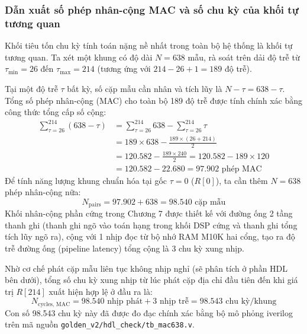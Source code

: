 \subsubsection*{Dẫn xuất số phép nhân-cộng MAC và số chu kỳ của khối tự tương quan}
Khối tiêu tốn chu kỳ tính toán nặng nề nhất trong toàn bộ hệ thống là khối tự tương quan. Ta xét một khung có độ dài $N = 638$ mẫu, rà soát trên dải độ trễ từ $\tau_{\min} = 26$ đến $\tau_{\max} = 214$ (tương ứng với $214 - 26 + 1 = 189$ độ trễ).

Tại một độ trễ $\tau$ bất kỳ, số cặp mẫu cần nhân và tích lũy là $N - \tau = 638 - \tau$. Tổng số phép nhân-cộng (MAC) cho toàn bộ 189 độ trễ được tính chính xác bằng công thức tổng cấp số cộng:
\begin{align}
\sum_{\tau=26}^{214} (638 - \tau) &= \sum_{\tau=26}^{214} 638 - \sum_{\tau=26}^{214} \tau \\
&= 189 \times 638 - \frac{189 \times (26 + 214)}{2} \\
&= 120.582 - \frac{189 \times 240}{2} = 120.582 - 189 \times 120 \\
&= 120.582 - 22.680 = 97.902\text{ phép MAC}
\end{align}
Để tính năng lượng khung chuẩn hóa tại gốc $\tau = 0$ ($R[0]$), ta cần thêm $N = 638$ phép nhân-cộng nữa:
\begin{equation}
N_{\text{pairs}} = 97.902 + 638 = 98.540\text{ cặp mẫu}
\end{equation}
Khối nhân-cộng phần cứng trong Chương 7 được thiết kế với đường ống 2 tầng thanh ghi (thanh ghi ngõ vào toán hạng trong khối DSP cứng và thanh ghi tổng tích lũy ngõ ra), cộng với 1 nhịp đọc từ bộ nhớ RAM M10K hai cổng, tạo ra độ trễ đường ống (pipeline latency) tổng cộng là 3 chu kỳ xung nhịp.

Nhờ cơ chế phát cặp mẫu liên tục không nhịp nghỉ (sẽ phân tích ở phần HDL bên dưới), tổng số chu kỳ xung nhịp từ lúc phát cặp địa chỉ đầu tiên đến khi giá trị $R[214]$ xuất hiện hợp lệ ở đầu ra là:
\begin{equation}
N_{\text{cycles, MAC}} = 98.540\text{ nhịp phát} + 3\text{ nhịp trễ} = 98.543\text{ chu kỳ/khung}
\end{equation}
Con số 98.543 chu kỳ này đã được đo đạc chính xác bằng bộ mô phỏng iverilog trên mã nguồn \texttt{golden\_v2/}\linebreak[0]\texttt{hdl\_check/}\linebreak[0]\texttt{tb\_mac638.v}.

